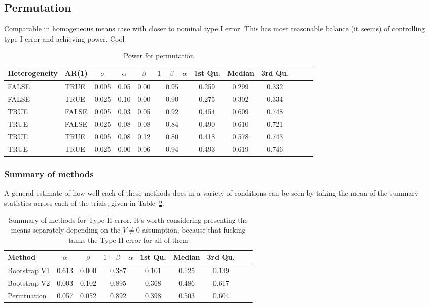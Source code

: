 \documentclass{article}
\begin{document}
\subsection{Permutation}

Comparable in homogeneous means case with closer to nominal type I error. This has most reasonable balance (it seems) of controlling type I error and achieving power. Cool

\begin{table}[H]
\centering
\begin{tabular}{llcccccccccc}
  \hline
Heterogeneity & AR(1) & $\sigma$  & $\alpha$ & $\beta$ & $1 - \beta - \alpha$  & 1st Qu. & Median & 3rd Qu.  \\ 
  \hline
FALSE & TRUE & 0.005 & 0.05 & 0.00 & 0.95 & 0.259 & 0.299 & 0.332 \\ 
  FALSE & TRUE & 0.025 & 0.10 & 0.00 & 0.90 & 0.275 & 0.302 & 0.334 \\ 
  TRUE & FALSE & 0.005 & 0.03 & 0.05 & 0.92 & 0.454 & 0.609 & 0.748 \\ 
  TRUE & FALSE & 0.025 & 0.08 & 0.08 & 0.84 & 0.490 & 0.610 & 0.721 \\ 
  TRUE & TRUE & 0.005 & 0.08 & 0.12 & 0.80 & 0.418 & 0.578 & 0.743 \\ 
  TRUE & TRUE & 0.025 & 0.00 & 0.06 & 0.94 & 0.493 & 0.619 & 0.746 \\ 
   \hline
\end{tabular}
\caption{Power for permutation} 
\label{tab:perm_pwr}
\end{table}

\subsubsection{Summary of methods}

A general estimate of how well each of these methods does in a variety of conditions can be seen by taking the mean of the summary statistics across each of the trials, given in Table~\ref{tab:type_2_summary}.

\begin{table}[H]
\centering
\begin{tabular}{lcccccccc}
  \hline
Method & $\alpha$ & $\beta$ & $1 - \beta - \alpha$  & 1st Qu. & Median & 3rd Qu.  \\ 
  \hline
Bootstrap V1 & 0.613 & 0.000 & 0.387 & 0.101 & 0.125 & 0.139 \\ 
  Bootstrap V2 & 0.003 & 0.102 & 0.895 & 0.368 & 0.486 & 0.617 \\ 
  Permtuation & 0.057 & 0.052 & 0.892 & 0.398 & 0.503 & 0.604 \\ 
   \hline
\end{tabular}
\caption{Summary of methods for Type II error. It's worth considering presenting the means separately depending on the $V \not=0$ assumption, because that fucking tanks the Type II error for all of them} 
\label{tab:type_2_summary}
\end{table}
\end{document}
